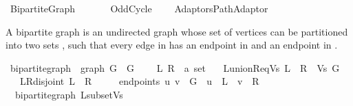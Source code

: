 %
\begin{isabellebody}%
%
%
\isadelimtheory
%
\endisadelimtheory
%
\isatagtheory
{}\isamarkupfalse%
\ Bipartite{\isacharunderscore}{\kern0pt}Graph\isanewline
\ \ \isanewline
\ \ \ \ Odd{\isacharunderscore}{\kern0pt}Cycle\isanewline
\ \ \ \ {\isachardoublequoteopen}{\isachardot}{\kern0pt}{\isachardot}{\kern0pt}{\isacharslash}{\kern0pt}Adaptors{\isacharslash}{\kern0pt}Path{\isacharunderscore}{\kern0pt}Adaptor{\isachardoublequoteclose}\isanewline
{}%
\endisatagtheory
{\isafoldtheory}%
%
\isadelimtheory
%
\endisadelimtheory
%
\begin{isamarkuptext}%
A bipartite graph is an undirected graph  whose set of vertices  can be
partitioned into two sets ,  such that every edge in  has an endpoint in
 and an endpoint in .%
\end{isamarkuptext}\isamarkuptrue%
\isamarkupfalse%
\ bipartite{\isacharunderscore}{\kern0pt}graph\ {\isacharequal}{\kern0pt}\ graph\ G\ \ G\ {\isacharplus}{\kern0pt}\isanewline
\ \ \ L\ R\ {\isacharcolon}{\kern0pt}{\isacharcolon}{\kern0pt}\ {\isachardoublequoteopen}{\isacharprime}{\kern0pt}a\ set{\isachardoublequoteclose}\isanewline
\ \ \ L{\isacharunderscore}{\kern0pt}union{\isacharunderscore}{\kern0pt}R{\isacharunderscore}{\kern0pt}eq{\isacharunderscore}{\kern0pt}Vs{\isacharcolon}{\kern0pt}\ {\isachardoublequoteopen}L\ {\isasymunion}\ R\ {\isacharequal}{\kern0pt}\ Vs\ G{\isachardoublequoteclose}\isanewline
\ \ \ L{\isacharunderscore}{\kern0pt}R{\isacharunderscore}{\kern0pt}disjoint{\isacharcolon}{\kern0pt}\ {\isachardoublequoteopen}L\ {\isasyminter}\ R\ {\isacharequal}{\kern0pt}\ {\isacharbraceleft}{\kern0pt}{\isacharbraceright}{\kern0pt}{\isachardoublequoteclose}\isanewline
\ \ \ endpoints{\isacharcolon}{\kern0pt}\ {\isachardoublequoteopen}{\isacharbraceleft}{\kern0pt}u{\isacharcomma}{\kern0pt}\ v{\isacharbraceright}{\kern0pt}\ {\isasymin}\ G\ {\isasymLongrightarrow}\ u\ {\isasymin}\ L\ {\isasymlongleftrightarrow}\ v\ {\isasymin}\ R{\isachardoublequoteclose}\isanewline
%
\isadeliminvisible
\isanewline
%
\endisadeliminvisible
%
\isataginvisible
{}\isamarkupfalse%
\ {\isacharparenleft}{\kern0pt}\ bipartite{\isacharunderscore}{\kern0pt}graph{\isacharparenright}{\kern0pt}\ L{\isacharunderscore}{\kern0pt}subset{\isacharunderscore}{\kern0pt}Vs{\isacharcolon}{\kern0pt}\isanewline

\end{isabellebody}
